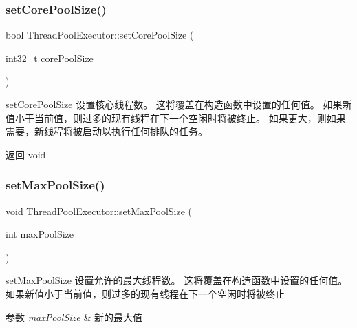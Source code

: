 \subsubsection{\texorpdfstring{set\+Core\+Pool\+Size()}{setCorePoolSize()}}
{\footnotesize\ttfamily bool Thread\+Pool\+Executor\+::set\+Core\+Pool\+Size (\begin{DoxyParamCaption}\item[{int32\+\_\+t}]{core\+Pool\+Size }\end{DoxyParamCaption})}



set\+Core\+Pool\+Size 设置核心线程数。 这将覆盖在构造函数中设置的任何值。 如果新值小于当前值，则过多的现有线程在下一个空闲时将被终止。 如果更大，则如果需要，新线程将被启动以执行任何排队的任务。 

\begin{DoxyReturn}{返回}
void 
\end{DoxyReturn}
\mbox{\label{classThreadPoolExecutor_a83e9e3715fdacc5b2f08b563d39bb62b}} 
\subsubsection{\texorpdfstring{set\+Max\+Pool\+Size()}{setMaxPoolSize()}}
{\footnotesize\ttfamily void Thread\+Pool\+Executor\+::set\+Max\+Pool\+Size (\begin{DoxyParamCaption}\item[{int}]{max\+Pool\+Size }\end{DoxyParamCaption})}



set\+Max\+Pool\+Size 设置允许的最大线程数。 这将覆盖在构造函数中设置的任何值。 如果新值小于当前值，则过多的现有线程在下一个空闲时将被终止 


\begin{DoxyParams}{参数}
{\em max\+Pool\+Size} & 新的最大值 \\
\hline
\end{DoxyParams}
\mbox{\label{classThreadPoolExecutor_ab04e6a91b39073eaafffa8fc22eae325}} 
